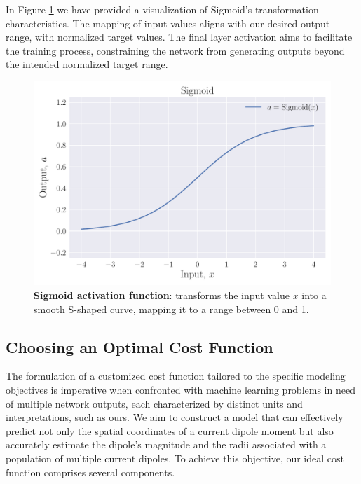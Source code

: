 \documentclass[a4paper, UKenglish, 11pt]{uiomaster}
\begin{document}
In Figure \ref{fig:sigmoid} we have provided a visualization of Sigmoid's transformation characteristics. The mapping of input values aligns with our desired output range, with normalized target values. The final layer activation aims to facilitate the training process, constraining the network from generating outputs beyond the intended normalized target range.

\begin{figure}
    \centering
    \includegraphics[width=\linewidth]{figures/Sigmoid.pdf}
    \caption{\textbf{Sigmoid activation function}: transforms the input value $x$ into a smooth S-shaped curve, mapping it to a range between 0 and 1.}
    \label{fig:sigmoid}
\end{figure}


\subsection{Choosing an Optimal Cost Function}
The formulation of a customized cost function tailored to the specific modeling objectives is imperative when confronted with machine learning problems in need of multiple network outputs, each characterized by distinct units and interpretations, such as ours.  We aim to construct a model that can effectively predict not only the spatial coordinates of a current dipole moment but also accurately estimate the dipole's magnitude and the radii associated with a population of multiple current dipoles. To achieve this objective, our ideal cost function comprises several components.
\end{document}
